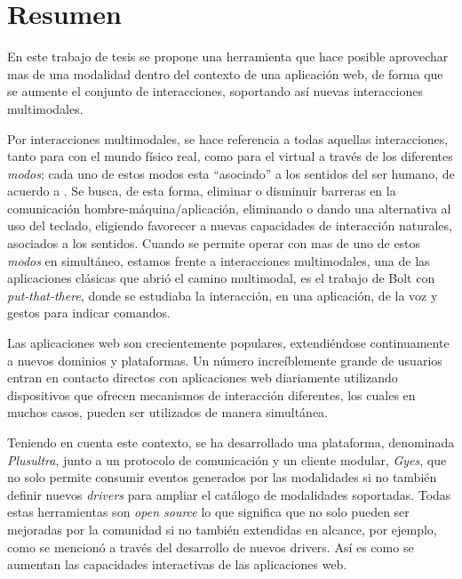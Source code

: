 

\begingroup
\let\clearpage\relax
\let\cleardoublepage\relax
\let\cleardoublepage\relax

\chapter*{Resumen} %
En este trabajo de tesis se propone una herramienta que hace posible aprovechar mas de una modalidad dentro del contexto de una aplicación web, de forma que se aumente el conjunto de interacciones, soportando así nuevas interacciones multimodales.

Por interacciones multimodales, se hace referencia a todas aquellas interacciones, tanto para con el mundo físico real, como para el virtual a través de los diferentes \emph{modos}; cada uno de estos modos esta ``asociado'' a los sentidos del ser humano, de acuerdo a \citet{Bourguet2003}. Se busca, de esta forma, eliminar o disminuir barreras en la comunicación hombre-máquina/aplicación, \eg eliminando o dando una alternativa al uso del teclado, eligiendo favorecer a nuevas capacidades de interacción naturales, \ie asociados a los sentidos.
Cuando se permite operar con mas de uno de estos \emph{modos} en simultáneo, estamos frente a interacciones multimodales, una de las aplicaciones clásicas que abrió el camino multimodal, es el trabajo de Bolt \citep{bolt1980put} con \emph{put-that-there}, donde se estudiaba la interacción, en una aplicación, de la voz y gestos para indicar comandos.

Las aplicaciones web son crecientemente populares, extendiéndose continuamente a nuevos dominios y plataformas. Un número increíblemente grande de usuarios entran en contacto directos con aplicaciones web diariamente utilizando dispositivos que ofrecen mecanismos de interacción diferentes, los cuales en muchos casos, pueden ser utilizados de manera simultánea.

Teniendo en cuenta este contexto, se ha desarrollado una plataforma, denominada \emph{Plusultra}, junto a un protocolo de comunicación y un cliente modular, \emph{Gyes}, que no solo permite consumir eventos generados por las modalidades si no también definir nuevos \emph{drivers} para ampliar el catálogo de modalidades soportadas. Todas estas herramientas son \emph{open source} lo que significa que no solo pueden ser mejoradas por la comunidad si no también extendidas en alcance, por ejemplo, como se mencionó a través del desarrollo de nuevos drivers. Así es como se aumentan las capacidades interactivas de las aplicaciones web.

